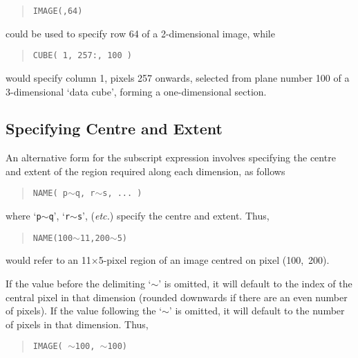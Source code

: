 {\small
\begin{quote}
\begin{center}
{\tt IMAGE(,64)}
\end{center}
\end{quote}
\normalsize

could be used to specify row 64 of a 2-dimensional image, while

\small
\begin{quote}
\begin{center}
{\tt CUBE( 1, 257:, 100 )}
\end{center}
\end{quote}
\normalsize

would specify column 1, pixels 257 onwards, selected from plane number
100 of a 3-dimensional `data cube', forming a one-dimensional section.

\subsection{Specifying Centre and Extent}

An alternative form for the subscript expression involves specifying the
centre and extent of the region required along each dimension, as
follows

\small
\begin{quote}
\begin{center}
{\tt NAME( p}$\sim${\tt q, r}$\sim${\tt s, ... )}
\end{center}
\end{quote}
\normalsize

where `{\tt p}$\sim${\tt q}', `{\tt r}$\sim${\tt s}', ({\it etc.})
specify the centre and extent. Thus, 

\small
\begin{quote}
\begin{center}
{\tt NAME(100}$\sim${\tt 11,200}$\sim${\tt 5)}
\end{center}
\end{quote}
\normalsize

would refer to an 11$\times$5-pixel region of an image centred on pixel
(100,~200).

If the value before the delimiting `$\sim$' is omitted, it will default
to the index of the central pixel in that dimension (rounded downwards
if there are an even number of pixels). If the value following the
`$\sim$' is omitted, it will default to the number of pixels in that
dimension. Thus, 

\small
\begin{quote}
\begin{center}
{\tt IMAGE( }$\sim${\tt 100, }$\sim${\tt 100)}
\end{center}
\end{quote}
\normalsize

}
